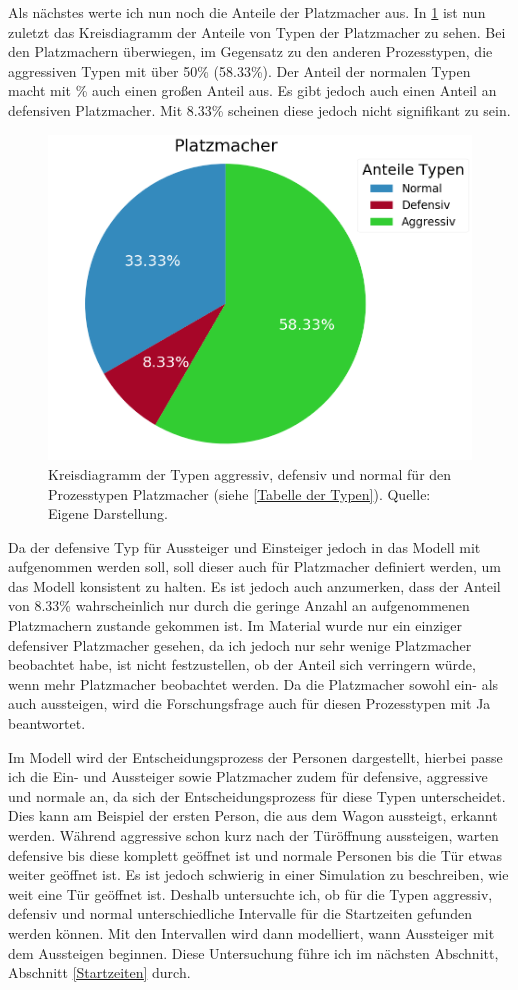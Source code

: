 Als nächstes werte ich nun noch die Anteile der Platzmacher aus.
In \figurename \ref{fig:AnteileTypenPlatzmacher} ist nun zuletzt das Kreisdiagramm der Anteile von Typen der Platzmacher zu sehen. Bei den Platzmachern überwiegen, im Gegensatz zu den anderen Prozesstypen, die aggressiven Typen mit über 50\% (58.33\%). Der Anteil der normalen Typen macht mit \%  auch einen großen Anteil aus. Es gibt jedoch auch einen Anteil an defensiven Platzmacher. Mit 8.33\% scheinen diese jedoch nicht signifikant zu sein.
\begin{figure}[H]
	\centering
		\includegraphics[height=0.35\textwidth]{pictures/data_evaluation/types/proportions_Platzmacher.png}
	\caption{Kreisdiagramm der Typen aggressiv, defensiv und normal für den Prozesstypen Platzmacher (siehe \ref{Tabelle der Typen}). Quelle: Eigene Darstellung.}
	\label{fig:AnteileTypenPlatzmacher}
\end{figure} Da der defensive Typ für Aussteiger und Einsteiger jedoch in das Modell mit aufgenommen werden soll, soll dieser auch für Platzmacher definiert werden, um das Modell konsistent zu halten. Es ist jedoch auch anzumerken, dass der Anteil von 8.33\% wahrscheinlich nur durch die geringe Anzahl an aufgenommenen Platzmachern zustande gekommen ist. Im Material wurde nur ein einziger defensiver Platzmacher gesehen, da ich jedoch nur sehr wenige Platzmacher beobachtet habe, ist nicht festzustellen, ob der Anteil sich verringern würde, wenn mehr Platzmacher beobachtet werden. Da die Platzmacher sowohl ein- als auch aussteigen, wird die Forschungsfrage auch für diesen Prozesstypen mit Ja beantwortet. 

Im Modell wird der Entscheidungsprozess der Personen dargestellt, hierbei passe ich die Ein- und Aussteiger sowie Platzmacher zudem für defensive, aggressive und normale an, da sich der Entscheidungsprozess für diese Typen unterscheidet. Dies kann am Beispiel der ersten Person, die aus dem Wagon aussteigt, erkannt werden. Während aggressive schon kurz nach der Türöffnung aussteigen, warten defensive bis diese komplett geöffnet ist und normale Personen bis die Tür etwas weiter geöffnet ist. Es ist jedoch schwierig in einer Simulation zu beschreiben, wie weit eine Tür geöffnet ist. Deshalb untersuchte ich, ob für die Typen aggressiv, defensiv und normal unterschiedliche Intervalle für die Startzeiten gefunden werden können. Mit den Intervallen wird dann modelliert, wann Aussteiger mit dem Aussteigen beginnen. Diese Untersuchung führe ich im nächsten Abschnitt, Abschnitt \ref{Startzeiten} durch.

